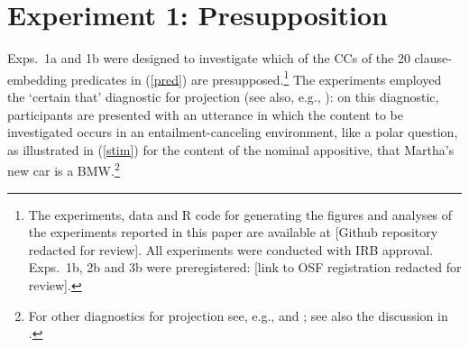 \documentclass[11pt,fleqn]{article}
\newcommand{\6}{\mbox{$[\hspace*{-.6mm}[$}}
\newcommand{\9}{\mbox{$]\hspace*{-.6mm}]$}}
\begin{document}


%
%
%
%


\section{Experiment 1: Presupposition}\label{s2}

Exps.~1a and 1b were designed to investigate which of the CCs of the 20 clause-embedding predicates in (\ref{pred}) are presupposed.\footnote{\label{f-github}The experiments, data and R code for generating the figures and analyses of the experiments reported in this paper are available at [Github repository redacted for review]. All experiments were conducted with IRB approval. Exps.~1b, 2b and 3b were preregistered: [link to OSF registration redacted for review].}
The experiments employed the `certain that' diagnostic for projection (see also, e.g., \citealt{tonhauser-salt26,djaerv-bacovcin-salt27,stevens-etal2017,lorson2018,tbd-variability,mahler-nels,demarneffe-etal-sub23}): on this diagnostic, participants are presented with an utterance in which the content to be investigated occurs in an entailment-canceling environment, like a polar question, as illustrated in (\ref{stim}) for the content of the nominal appositive, that Martha's new car is a BMW.\footnote{For other diagnostics for projection see, e.g., \citealt{smith-hall11,xue-onea11} and \citealt{brst-lang11}; see also the discussion in \citealt{tbd-variability}.} 
\end{document}
